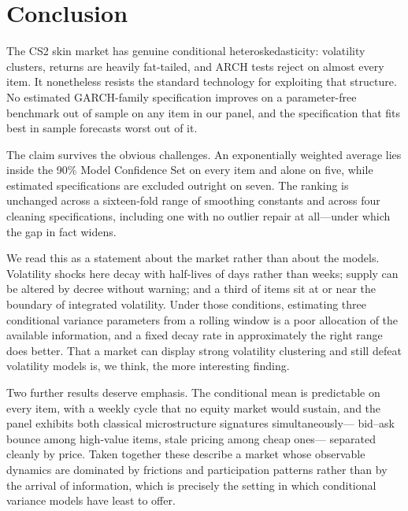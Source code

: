\documentclass[11pt,a4paper]{article}
\begin{document}
\section{Conclusion}

The CS2 skin market has genuine conditional heteroskedasticity: volatility
clusters, returns are heavily fat-tailed, and ARCH tests reject on almost every
item. It nonetheless resists the standard technology for exploiting that
structure. No estimated GARCH-family specification improves on a
parameter-free benchmark out of sample on any item in our panel, and the
specification that fits best in sample forecasts worst out of it.

The claim survives the obvious challenges. An exponentially weighted average
lies inside the 90\% Model Confidence Set on every item and alone on five,
while estimated specifications are excluded outright on seven. The ranking is
unchanged across a sixteen-fold range of smoothing constants and across four
cleaning specifications, including one with no outlier repair at all---under
which the gap in fact widens.

We read this as a statement about the market rather than about the models.
Volatility shocks here decay with half-lives of days rather than weeks;
supply can be altered by decree without warning; and a third of items sit at or
near the boundary of integrated volatility. Under those conditions, estimating
three conditional variance parameters from a rolling window is a poor
allocation of the available information, and a fixed decay rate in
approximately the right range does better. That a market can display strong
volatility clustering and still defeat volatility models is, we think, the more
interesting finding.

Two further results deserve emphasis. The conditional mean is predictable on
every item, with a weekly cycle that no equity market would sustain, and the
panel exhibits both classical microstructure signatures simultaneously---
bid--ask bounce among high-value items, stale pricing among cheap ones---
separated cleanly by price. Taken together these describe a market whose
observable dynamics are dominated by frictions and participation patterns
rather than by the arrival of information, which is precisely the setting in
which conditional variance models have least to offer.
\end{document}
